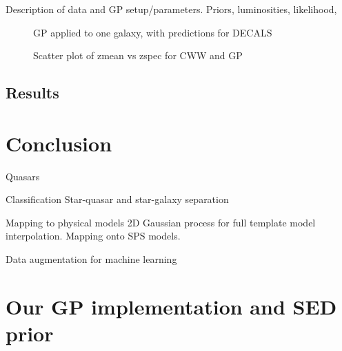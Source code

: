 \documentclass[aps,prd,showpacs,superscriptaddress,groupedaddress]{revtex4}  %
\begin{document}
Description of data and GP setup/parameters.
Priors, luminosities, likelihood, 

\begin{figure}
\caption{GP applied to one galaxy, with predictions for DECALS}
\end{figure}

\begin{figure}
\caption{Scatter plot of zmean vs zspec for CWW and GP}
\end{figure}

\subsection{Results}






\section{Conclusion}\label{sec:concl}

Quasars

{Classification}
Star-quasar and star-galaxy separation

{Mapping to physical models}
2D Gaussian process for full template model interpolation.
Mapping onto SPS models.

Data augmentation for machine learning


\footnotesize{
  
\providecommand{\eprint}[1]{\href{http://arxiv.org/abs/#1}{arXiv:#1}}	
  
}
\normalsize


\appendix
\section{Our GP implementation and SED prior}\label{sec:rbfgp}
\end{document}
